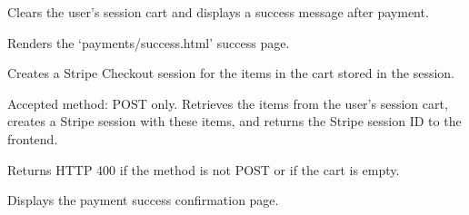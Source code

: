 \documentclass[letterpaper,10pt,english]{sphinxmanual}
\begin{document}
\begin{fulllineitems}
\label{\detokenize{payments:payments.views.cart_success}}
\pysigstartsignatures
\pysiglinewithargsret
{}
{}
{}
\pysigstopsignatures
\sphinxAtStartPar
Clears the user’s session cart and displays a success message after payment.

\sphinxAtStartPar
Renders the ‘payments/success.html’ success page.

\end{fulllineitems}


\begin{fulllineitems}
\label{\detokenize{payments:payments.views.create_checkout_session}}
\pysigstartsignatures
\pysiglinewithargsret
{}
{}
{}
\pysigstopsignatures
\sphinxAtStartPar
Creates a Stripe Checkout session for the items in the cart stored in the session.

\sphinxAtStartPar
Accepted method: POST only.
Retrieves the items from the user’s session cart, creates a Stripe session with these items,
and returns the Stripe session ID to the frontend.

\sphinxAtStartPar
Returns HTTP 400 if the method is not POST or if the cart is empty.

\end{fulllineitems}


\begin{fulllineitems}
\label{\detokenize{payments:payments.views.payment_success}}
\pysigstartsignatures
\pysiglinewithargsret
{}
{}
{}
\pysigstopsignatures
\sphinxAtStartPar
Displays the payment success confirmation page.

\end{fulllineitems}

\end{document}
